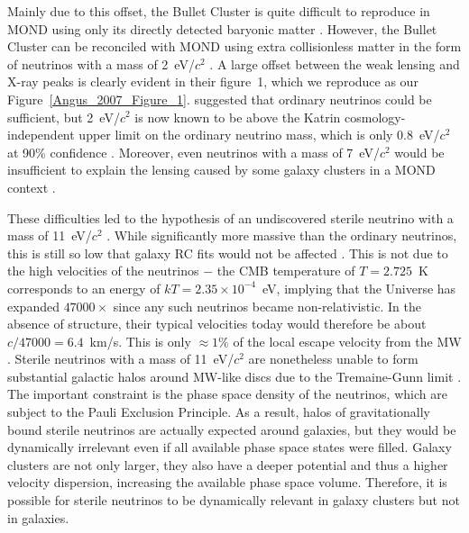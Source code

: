 \documentclass[fleqn,usenatbib,useAMS]{mnras} %
\begin{document}
Mainly due to this offset, the Bullet Cluster is quite difficult to reproduce in MOND using only its directly detected baryonic matter \citep{Knebe_2009}. However, the Bullet Cluster can be reconciled with MOND using extra collisionless matter in the form of neutrinos with a mass of 2~eV/$c^2$ \citep{Angus_2007}. A large offset between the weak lensing and X-ray peaks is clearly evident in their figure~1, which we reproduce as our Figure~\ref{Angus_2007_Figure_1}. \citet{Angus_2007} suggested that ordinary neutrinos could be sufficient, but 2~eV/$c^2$ is now known to be above the Katrin cosmology-independent upper limit on the ordinary neutrino mass, which is only 0.8~eV/$c^2$ at 90\% confidence \citep{Katrin_2019, Katrin_2022}. Moreover, even neutrinos with a mass of 7~eV/$c^2$ would be insufficient to explain the lensing caused by some galaxy clusters in a MOND context \citep{Natarajan_2008}.

These difficulties led to the hypothesis of an undiscovered sterile neutrino with a mass of 11~eV/$c^2$ \citep{Angus_2009}. While significantly more massive than the ordinary neutrinos, this is still so low that galaxy RC fits would not be affected \citep{Angus_2010_minimum_neutrino_mass}. This is not due to the high velocities of the neutrinos $-$ the CMB temperature of $T = 2.725$~K corresponds to an energy of $kT = 2.35 \times 10^{-4}$~eV, implying that the Universe has expanded $47000\times$ since any such neutrinos became non-relativistic. In the absence of structure, their typical velocities today would therefore be about $c/47000 = 6.4$~km/s. This is only $\approx 1\%$ of the local escape velocity from the MW \citep{Williams_2017, Monari_2018}. Sterile neutrinos with a mass of 11~eV/$c^2$ are nonetheless unable to form substantial galactic halos around MW-like discs due to the Tremaine-Gunn limit \citep{Tremaine_Gunn_1979}. The important constraint is the phase space density of the neutrinos, which are subject to the Pauli Exclusion Principle. As a result, halos of gravitationally bound sterile neutrinos are actually expected around galaxies, but they would be dynamically irrelevant even if all available phase space states were filled. Galaxy clusters are not only larger, they also have a deeper potential and thus a higher velocity dispersion, increasing the available phase space volume. Therefore, it is possible for sterile neutrinos to be dynamically relevant in galaxy clusters but not in galaxies.
\end{document}
